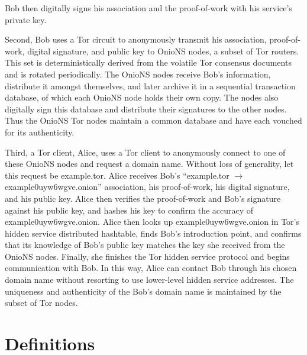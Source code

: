 Bob then digitally signs his association and the proof-of-work with his service's private key.

Second, Bob uses a Tor circuit to anonymously transmit his association, proof-of-work, digital signature, and public key to OnioNS nodes, a subset of Tor routers. This set is deterministically derived from the volatile Tor consensus documents and is rotated periodically. The OnioNS nodes receive Bob's information, distribute it amongst themselves, and later archive it in a sequential transaction database, of which each OnioNS node holds their own copy. The nodes also digitally sign this database and distribute their signatures to the other nodes. Thus the OnioNS Tor nodes maintain a common database and have each vouched for its authenticity.

Third, a Tor client, Alice, uses a Tor client to anonymously connect to one of these OnioNS nodes and request a domain name. Without loss of generality, let this request be example.tor. Alice receives Bob's ``example.tor $ \rightarrow $ example0uyw6wgve.onion'' association, his proof-of-work, his digital signature, and his public key. Alice then verifies the proof-of-work and Bob's signature against his public key, and hashes his key to confirm the accuracy of example0uyw6wgve.onion. Alice then looks up example0uyw6wgve.onion in Tor's hidden service distributed hashtable, finds Bob's introduction point, and confirms that its knowledge of Bob's public key matches the key she received from the OnioNS nodes. Finally, she finishes the Tor hidden service protocol and begins communication with Bob. In this way, Alice can contact Bob through his chosen domain name without resorting to use lower-level hidden service addresses. The uniqueness and authenticity of the Bob's domain name is maintained by the subset of Tor nodes.




\section{Definitions}

